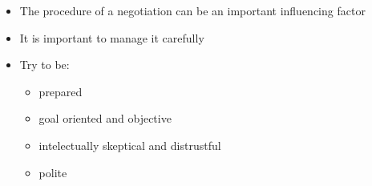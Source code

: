 \begin{itemize}
    \item The procedure of a negotiation can be an important influencing factor
    \item It is important to manage it carefully
    \item Try to be:
        \begin{itemize}
            \item prepared
            \item goal oriented and objective
            \item intelectually skeptical and distrustful
            \item polite
        \end{itemize}
\end{itemize}
